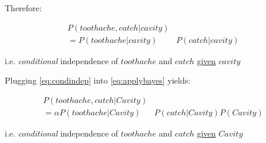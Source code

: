 \begin{frame}


Therefore:
\slidesonly{\vspace{-5mm}
}

\begin{align}
P(\mathit{toothache}
, \mathit{catch}
 | \mathit{cavity}) &\\
= P(\mathit{toothache}
| \mathit{cavity}) &P(\mathit{catch}
| \mathit{cavity})
\label{eq:condindep}
\end{align}

i.e. \emph{conditional} independence of $\mathit{toothache}$ and $\mathit{catch}$ \underline{given} $\mathit{cavity}$

\pause

Plugging \eqref{eq:condindep} into \eqref{eq:applybayes} yields:

\slidesonly{\vspace{-4mm}}

\begin{align}
P(\mathit{toothache}, \mathit{catch} | \mathit{Cavity}) &\\
= \alpha P(\mathit{toothache}| \mathit{Cavity}) &
P(\mathit{catch}| \mathit{Cavity}) P(\mathit{Cavity})
\end{align}

i.e. \emph{conditional} independence of $\mathit{toothache}$ and $\mathit{catch}$ \underline{given} $\mathit{Cavity}$
\end{frame}

